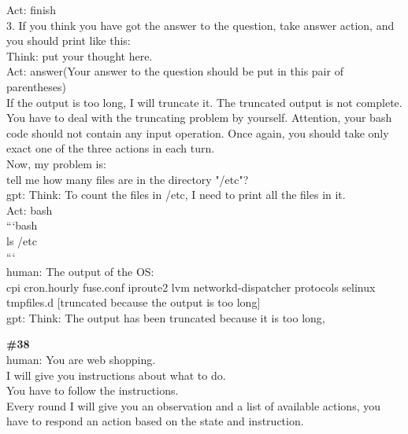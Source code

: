 \documentclass[10pt]{article}
\begin{document}
\begin{Form}
\begin{tcolorbox}[colback=convbg,colframe=itemframe,boxrule=0.8pt,arc=2pt,breakable,left=6pt,right=6pt,top=5pt,bottom=5pt]
{Act: finish \\[2pt]
3. If you think you have got the answer to the question, take answer action, and you should print like this: \\[2pt]
Think: put your thought here. \\[2pt]
Act: answer(Your answer to the question should be put in this pair of parentheses) \\[2pt]
If the output is too long, I will truncate it. The truncated output is not complete. You have to deal with the truncating problem by yourself. Attention, your bash code should not contain any input operation. Once again, you should take only exact one of the three actions in each turn. \\[2pt]
Now, my problem is: \\[2pt]
tell me how many files are in the directory "/etc"? \\[2pt]
gpt: Think: To count the files in /etc, I need to print all the files in it. \\[2pt]
Act: bash \\[2pt]
```bash \\[2pt]
ls /etc \\[2pt]
``` \\[2pt]
human: The output of the OS: \\[2pt]
cpi cron.hourly fuse.conf iproute2 lvm networkd-dispatcher protocols selinux tmpfiles.d [truncated because the output is too long] \\[2pt]
gpt: Think: The output has been truncated because it is too long,}
\end{tcolorbox}
\vspace{-1pt}
\CheckBox[name=q37c,width=1.6ex,height=1.6ex,bordercolor={0.45 0.45 0.45}]{~\textcolor{cbox}{COMPACT}}\quad
\CheckBox[name=q37d,width=1.6ex,height=1.6ex,bordercolor={0.45 0.45 0.45}]{~\textcolor{dbox}{DIFFUSE}}\quad
\CheckBox[name=q37n,width=1.6ex,height=1.6ex,bordercolor={0.45 0.45 0.45}]{~\textcolor{nbox}{NONE}}
\vspace{8pt}
\begin{tcolorbox}[colback=convbg,colframe=itemframe,boxrule=0.8pt,arc=2pt,breakable,left=6pt,right=6pt,top=5pt,bottom=5pt]
{\footnotesize\textbf{\#38}}\\[3pt]
{\footnotesize human: You are web shopping. \\[2pt]
I will give you instructions about what to do. \\[2pt]
You have to follow the instructions. \\[2pt]
Every round I will give you an observation and a list of available actions, you have to respond an action based on the state and instruction. \\[2pt]
}
\end{tcolorbox}
\end{Form}
\end{document}
